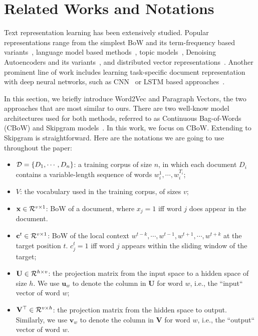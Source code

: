 \documentclass{article} \usepackage{iclr2017_conference,times}
\newcommand{\ul}{\mathbf{u}}
\newcommand{\vl}{\mathbf{v}}
\newcommand{\cl}{\mathbf{c}}
\newcommand{\xl}{\mathbf{x}}
\newcommand{\uul}{\mathbf{U}}
\newcommand{\vvl}{\mathbf{V}}
\begin{document}
\section{Related Works and Notations}

Text representation learning has been extensively studied. Popular representations range from the simplest BoW and its term-frequency based variants~\citep{salton1988term}, language model based methods~\citep{croft2013language,mikolov2010recurrent,kim2015character}, topic models~\citep{deerwester1990indexing,blei2003latent}, Denoising Autoencoders and its variants~\citep{vincent2008extracting,chen2012marginalized}, and distributed vector representations~\citep{mesnil2014ensemble,le2014distributed,kiros2015skip}. Another prominent line of work includes learning task-specific document representation with deep neural networks, such as CNN~\citep{zhang2015text} or LSTM based approaches~\citep{tai2015improved,dai2015semi}. 

In this section, we briefly introduce Word2Vec and Paragraph Vectors, the two approaches that are most similar to ours. There are two well-know model architectures used for both methods, referred to as Continuous Bag-of-Words (CBoW) and Skipgram models~\citep{mikolov2013efficient}. In this work, we focus on CBoW. Extending to Skipgram is straightforward. Here are the notations we are going to use throughout the paper:
\begin{itemize}[leftmargin=*]
\item[] ${\cal D} = \{D_1, \cdots, D_n\}$: a training corpus of size $n$, in which each document $D_i$ contains a variable-length sequence of words $w_i^1, \cdots, w_i^{T_i}$; 
\item[] $V$: the vocabulary used in the training corpus, of sizes $v$;
\item[] $\xl \in {\cal R}^{v\times 1}$:  BoW of a document, where $x_j = 1$ iff word $j$ does appear in the document. 
\item[] $\cl^t \in {\cal R}^{v\times 1}$: BoW of the local context $w^{t-k}, \cdots, w^{t-1}, w^{t+1}, \cdots, w^{t+k}$ at the target position $t$. $c_j^t = 1$ iff word $j$ appears within the sliding window of the target;
\item[] $\uul\in {\cal R}^{h\times v}$: the projection matrix from the input space to a hidden space of size $h$. We use $\ul_w$ to denote the column in $\uul$ for word $w$, i.e., the ``input`` vector of word $w$;
\item[] $\vvl^\top\in{\cal R}^{v\times h}$: the projection matrix from the hidden space to output. Similarly, we use $\vl_w$ to denote the column in $\vvl$ for word $w$, i.e., the ``output`` vector of word $w$.
\end{itemize}
\end{document}
